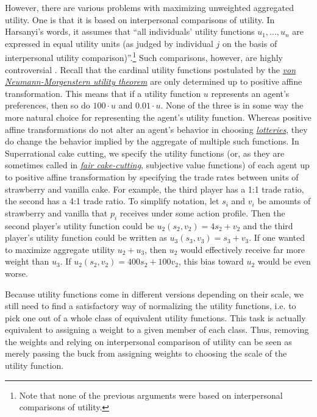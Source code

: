 However, there are various problems with maximizing unweighted
aggregated utility. One is that it is based on interpersonal comparisons
of utility. In Harsanyi's words, it assumes that ``all individuals'
utility functions \(u_{1},...,u_{n}\) are expressed in equal utility
units (as judged by individual \(j\) on the basis of interpersonal
utility comparison)''.\footnote{Note that none of the previous arguments
  were based on interpersonal comparisons of utility.} Such comparisons,
however, are highly controversial
\parencite{Hammond1991-rj,Binmore2007-da}. Recall that the
cardinal utility functions postulated by the
\href{https://en.wikipedia.org/wiki/Von_Neumann\%E2\%80\%93Morgenstern_utility_theorem}{\emph{von
Neumann-Morgenstern utility theorem}} are only determined up to positive
affine transformation. This means that if a utility function \(u\)
represents an agent's preferences, then so do \(100 \cdot u\) and
\(0.01 \cdot u\). None of the three is in some way the more natural
choice for representing the agent's utility function. Whereas positive
affine transformations do not alter an agent's behavior in choosing
\href{https://en.wikipedia.org/wiki/Von_Neumann\%E2\%80\%93Morgenstern_utility_theorem\#Set-up}{\emph{lotteries}},
they do change the behavior implied by the aggregate of multiple such
functions. In Superrational cake cutting, we specify the utility
functions (or, as they are sometimes called in
\href{https://en.wikipedia.org/wiki/Fair_cake-cutting}{\emph{fair
cake-cutting}}, subjective value functions) of each agent up to positive
affine transformation by specifying the trade rates between units of
strawberry and vanilla cake. For example, the third player has a 1:1
trade ratio, the second has a 4:1 trade ratio. To simplify notation, let
\(s_{i}\) and \(v_{i}\) be amounts of strawberry and vanilla that
\(p_{i}\) receives under some action profile. Then the second player's
utility function could be \(u_{2}(s_{2},v_{2}) = 4s_{2} + v_{2}\) and the
third player's utility function could be written as
\(u_{3}(s_{3},v_{3}) = s_{3} + v_{3}\). If one wanted to maximize
aggregate utility \(u_{2} + u_{3}\), then \(u_{2}\) would effectively
receive far more weight than \(u_{3}\). If
\(u_{2}(s_{2},v_{2}) = 400s_{2} + 100v_{2}\), this bias toward \(u_{2}\)
would be even worse.

Because utility functions come in different versions depending on their
scale, we still need to find a satisfactory way of normalizing the
utility functions, i.e. to pick one out of a whole class of equivalent
utility functions. This task is actually equivalent to assigning a
weight to a given member of each class. Thus, removing the weights and
relying on interpersonal comparison of utility can be seen as merely
passing the buck from assigning weights to choosing the scale of the
utility function.

